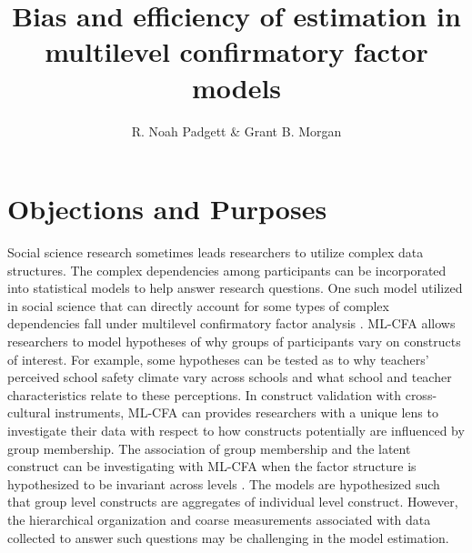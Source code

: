 \documentclass[man, noextraspace, 12pt]{apa7}
\title{Bias and efficiency of estimation in multilevel confirmatory factor models}
\author{R. Noah Padgett \& Grant B. Morgan}
\affiliation{Baylor University}
\begin{document}
\maketitle

\setlength{\abovedisplayskip}{3pt}
\setlength{\belowdisplayskip}{3pt}

\section{Objections and Purposes}

Social science research sometimes leads researchers to utilize complex data structures.
The complex dependencies among participants can be incorporated into statistical models to help answer research questions.
One such model utilized in social science that can directly account for some types of complex dependencies fall under multilevel confirmatory factor analysis \citep[ML-CFA,][]{Goldstein1988, Muthen1994}.
ML-CFA allows researchers to model hypotheses of why groups of participants vary on constructs of interest.
For example, some hypotheses can be tested as to why teachers' perceived school safety climate vary across schools and what school and teacher characteristics relate to these perceptions.
In construct validation with cross-cultural instruments, ML-CFA can provides researchers with a unique lens to investigate their data with respect to how constructs potentially are influenced by group membership.
The association of group membership and the latent construct can be investigating with ML-CFA when the factor structure is hypothesized to be invariant across levels \citep[][Models 4-5, pg. 488]{Stapleton2016}.
The models are hypothesized such that group level constructs are aggregates of individual level construct.
However, the hierarchical organization and coarse measurements associated with data collected to answer such questions may be challenging in the model estimation.
\end{document}

